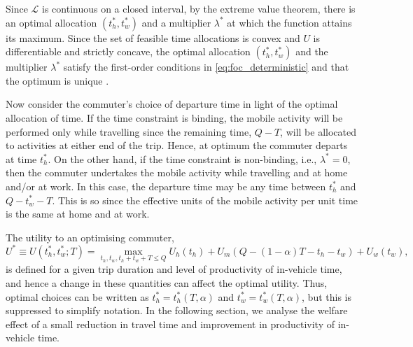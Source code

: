 \documentclass[12pt,a4paper,british]{article}
\makeatletter
\newenvironment{proof}[1][\proofname]{\par
    \normalfont\topsep6\p@\@plus6\p@\relax
    \trivlist
    \itemindent\parindent
    \item[\hskip\labelsep
          \scshape
      #1]\ignorespaces
  }{%
    \endtrivlist\@endpefalse
  }
\providecommand{\proofname}{Proof}
\makeatother
\begin{document}
\begin{proof} 
Since $\mathcal{L}$ is continuous on a closed interval, by the extreme value theorem, there is an optimal allocation $\left(t_{h}^{\ast},t_{w}^{\ast}\right)$ and a multiplier $\lambda^{\ast}$ at which the function attains its maximum. Since the set of feasible time allocations is convex and $U$ is differentiable and strictly concave, the optimal allocation  $\left(t_{h}^{\ast},t_{w}^{\ast}\right)$ and the multiplier $\lambda^{\ast} $ satisfy the first-order conditions in \eqref{eq:foc_deterministic} and that the optimum is unique \citep[Theorem 1.19 and Theorem 1.20 in][]{delaFonte_mathematical_2000}.
\end{proof}

Now consider the commuter's choice of departure time in light of the optimal allocation of time. If the time constraint is binding, the mobile activity will be performed only while travelling since the remaining time, $Q-T$, will be allocated to activities at either end of the trip. Hence, at optimum the commuter departs at time $t_{h}^{\ast}$. On the other hand, if the time constraint is non-binding, i.e., $\lambda^{\ast}=0$, then the commuter undertakes the mobile activity while travelling and at home and/or at work. In this case, the departure time may be any time between $t_{h}^{\ast}$ and $Q-t_{w}^{\ast}-T$. This is so since the effective units of the mobile activity per unit time is the same at home and at work.

The utility to an optimising commuter,%
\begin{equation}
U^{\ast}\equiv U\left(t_{h}^{\ast},t_{w}^{\ast};T\right)=\max_{t_{h},t_{w},t_{h}+t_{w}+T\leq Q}U_{h}\left(t_{h}\right)+U_{m}\left(Q-\left(1-\alpha\right)T-t_{h}-t_{w}\right)+U_{w}\left(t_{w}\right),
\label{eq:UStarDet}
\end{equation}
is defined for a given trip duration and level of productivity of in-vehicle time, and hence a change in these quantities can affect the optimal utility. Thus, optimal choices can be written as $t_h^{\ast}= t_h^{\ast} \left(T, \alpha \right)$ and $t_w^{\ast} = t_w^{\ast} \left(T, \alpha \right)$, but this is suppressed to simplify notation. In the following section, we analyse the welfare effect of a small reduction in travel time and improvement in productivity of in-vehicle time. %
\end{document}
